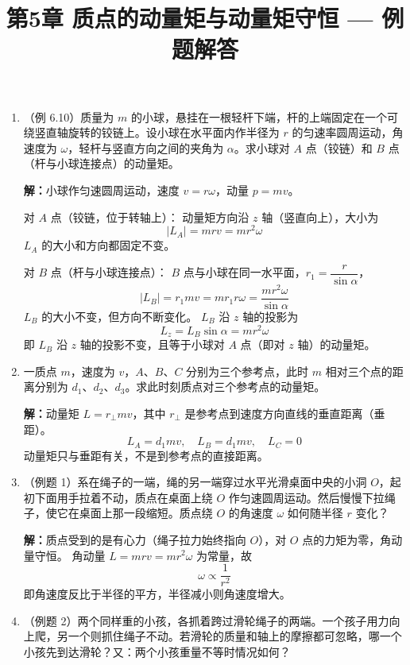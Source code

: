 \documentclass{ctexart}
\title{\textbf{第5章 质点的动量矩与动量矩守恒} --- 例题解答}
\author{}
\date{}
\begin{document}
\maketitle

\begin{enumerate}

\item（例 6.10）质量为 $m$ 的小球，悬挂在一根轻杆下端，杆的上端固定在一个可绕竖直轴旋转的铰链上。设小球在水平面内作半径为 $r$ 的匀速率圆周运动，角速度为 $\omega$，轻杆与竖直方向之间的夹角为 $\alpha$。求小球对 $A$ 点（铰链）和 $B$ 点（杆与小球连接点）的动量矩。

\textbf{解：}小球作匀速圆周运动，速度 $v = r\omega$，动量 $p = mv$。

对 $A$ 点（铰链，位于转轴上）：
动量矩方向沿 $z$ 轴（竖直向上），大小为
\[
|L_A| = mrv = mr^{2}\omega
\]
$L_A$ 的大小和方向都固定不变。

对 $B$ 点（杆与小球连接点）：
$B$ 点与小球在同一水平面，$r_1 = \dfrac{r}{\sin\alpha}$，
\[
|L_B| = r_1 m v = m r_1 r\omega = \frac{mr^{2}\omega}{\sin\alpha}
\]
$L_B$ 的大小不变，但方向不断变化。
$L_B$ 沿 $z$ 轴的投影为
\[
L_z = L_B\sin\alpha = mr^{2}\omega
\]
即 $L_B$ 沿 $z$ 轴的投影不变，且等于小球对 $A$ 点（即对 $z$ 轴）的动量矩。

\item 一质点 $m$，速度为 $v$，$A$、$B$、$C$ 分别为三个参考点，此时 $m$ 相对三个点的距离分别为 $d_1$、$d_2$、$d_3$。求此时刻质点对三个参考点的动量矩。

\textbf{解：}动量矩 $L = r_\perp mv$，其中 $r_\perp$ 是参考点到速度方向直线的垂直距离（垂距）。
\[
L_A = d_1 mv,\quad L_B = d_1 mv,\quad L_C = 0
\]
动量矩只与垂距有关，不是到参考点的直接距离。

\item（例题 1）系在绳子的一端，绳的另一端穿过水平光滑桌面中央的小洞 $O$，起初下面用手拉着不动，质点在桌面上绕 $O$ 作匀速圆周运动。然后慢慢下拉绳子，使它在桌面上那一段缩短。质点绕 $O$ 的角速度 $\omega$ 如何随半径 $r$ 变化？

\textbf{解：}质点受到的是有心力（绳子拉力始终指向 $O$），对 $O$ 点的力矩为零，角动量守恒。
角动量 $L = mrv = mr^{2}\omega$ 为常量，故
\[
\omega \propto \frac{1}{r^{2}}
\]
即角速度反比于半径的平方，半径减小则角速度增大。

\item（例题 2）两个同样重的小孩，各抓着跨过滑轮绳子的两端。一个孩子用力向上爬，另一个则抓住绳子不动。若滑轮的质量和轴上的摩擦都可忽略，哪一个小孩先到达滑轮？又：两个小孩重量不等时情况如何？


\end{enumerate}
\end{document}
